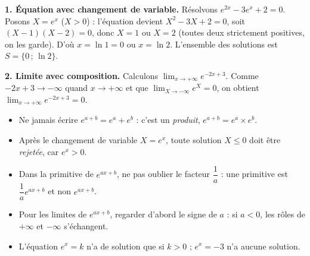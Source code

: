 \documentclass[11pt]{article}
\begin{document}
\begin{exemplebox}
\textbf{1. Équation avec changement de variable.} Résolvons $e^{2x}-3e^x+2=0$.
Posons $X=e^x$ ($X>0$) : l'équation devient $X^2-3X+2=0$, soit $(X-1)(X-2)=0$, donc $X=1$ ou $X=2$ (toutes deux strictement positives, on les garde). D'où $x=\ln 1=0$ ou $x=\ln 2$. L'ensemble des solutions est $S=\{0\,;\,\ln 2\}$.

\textbf{2. Limite avec composition.} Calculons $\displaystyle\lim_{x\to+\infty}e^{-2x+3}$.
Comme $-2x+3\to-\infty$ quand $x\to+\infty$ et que $\displaystyle\lim_{X\to-\infty}e^X=0$, on obtient $\displaystyle\lim_{x\to+\infty}e^{-2x+3}=0$.
\end{exemplebox}

\begin{attention}
\begin{itemize}
\item Ne jamais écrire $e^{a+b}=e^a+e^b$ : c'est un \emph{produit}, $e^{a+b}=e^a\times e^b$.
\item Après le changement de variable $X=e^x$, toute solution $X\leq 0$ doit être \emph{rejetée}, car $e^x>0$.
\item Dans la primitive de $e^{ax+b}$, ne pas oublier le facteur $\dfrac{1}{a}$ : une primitive est $\dfrac{1}{a}e^{ax+b}$ et non $e^{ax+b}$.
\item Pour les limites de $e^{ax+b}$, regarder d'abord le signe de $a$ : si $a<0$, les rôles de $+\infty$ et $-\infty$ s'échangent.
\item L'équation $e^x=k$ n'a de solution que si $k>0$ ; $e^x=-3$ n'a aucune solution.
\end{itemize}
\end{attention}
\end{document}
